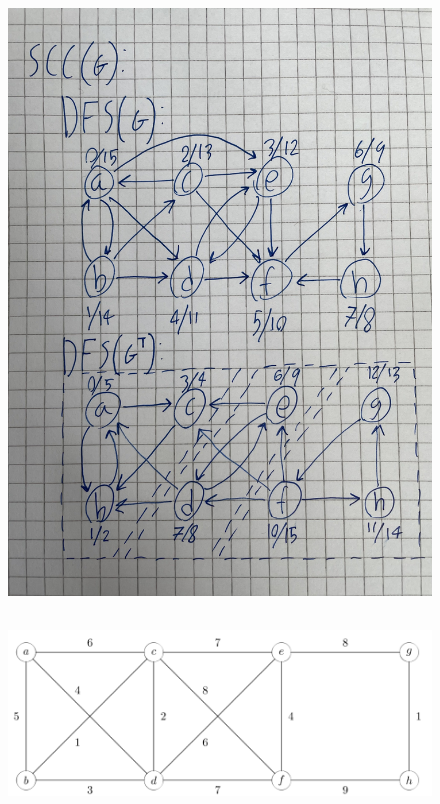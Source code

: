 \documentclass[a4paper,12pt]{article}
\begin{document}
\begin{figure}[H]
    \centering
    \includegraphics[width=1\textwidth]{SCC.jpg}
    \caption{}
\end{figure}

\subsection[]{}



\begin{figure}[H]
    \centering
    \includegraphics[width=1\textwidth]{2.png}
    \caption{}
\end{figure}
\end{document}
